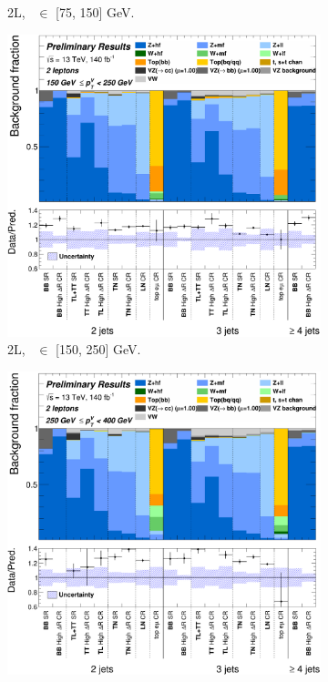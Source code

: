 \begin{figure}[h!]
{\begin{subfigure}[b]{0.37\textwidth}
            \caption{2L, \ptv\ $\in$ [75, 150] GeV.}
            \label{fig:backCom_2L_1}
        \end{subfigure}
        \begin{subfigure}[b]{0.37\textwidth}
            \centering
            \includegraphics[width=\textwidth]{Images/VH/Own_fit/backCom_uncPrefit/GlobalFit_unconditional__Prefit/C_SRCRs_L2_BMax250_BMin150.png}
            \caption{2L, \ptv\ $\in$ [150, 250] GeV.}
            \label{fig:backCom_2L_2}
        \end{subfigure}
        \begin{subfigure}[b]{0.37\textwidth}
            \centering
            \includegraphics[width=\textwidth]{Images/VH/Own_fit/backCom_uncPrefit/GlobalFit_unconditional__Prefit/C_SRCRs_L2_BMax400_BMin250.png}

\end{subfigure}}
\end{figure}
